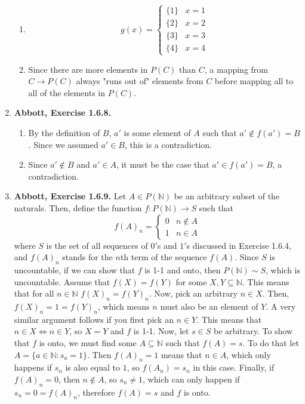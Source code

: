 \documentclass{article}
\newcommand{\N}{\mathbb{N}}
\newcommand{\exc}[2][Abbott]{\item \textbf{#1, Exercise #2.}}
\begin{document}
\begin{enumerate}
\begin{enumerate}
		\item \begin{equation*}
		      g(x) = \begin{cases}
		      \{1\} & x = 1 \\
		      \{2\} & x = 2 \\
		      \{3\} & x = 3 \\ 
		      \{4\} & x = 4
		\end{cases}
		\end{equation*}
							      		      	        
		\item Since there are more elements in $P(C)$ than $C$, a mapping from $C \rightarrow P(C)$ always "runs out of" elements from $C$ before mapping all to all of the elements in $P(C)$.
	\end{enumerate}
				      	          
	\exc{1.6.8}
				      	          
	\begin{enumerate}
		\item By the definition of $B$, $a'$ is some element of $A$ such that $a' \notin f(a') = B$. Since we assumed $a' \in B$, this is a contradiction.
		      		      		      	      	      	      	              
		\item Since $a' \notin B$ and $a' \in A$, it must be the case that $a' \in f(a') = B$, a contradiction.
	\end{enumerate}
				      	          
	\exc{1.6.9}
	Let $A \in P(\N)$ be an arbitrary subset of the naturals. Then, define the function $f : P(\N) \rightarrow S$ such that
	\begin{equation*}
		f(A)_n = \begin{cases}
		0 & n \notin A \\
		1 & n \in A
		\end{cases}
	\end{equation*}
	where $S$ is the set of all sequences of $0'$s and $1'$s discussed in Exercise 1.6.4, and $f(A)_n$ stands for the $n$th term of the sequence $f(A)$. Since $S$ is uncountable, if we can show that $f$ is 1-1 and onto, then $P(\N) \sim S$, which is uncountable. Assume that $f(X) = f(Y)$ for some $X, Y \subseteq \N$. This means that for all $n \in \N$ $f(X)_n = f(Y)_n$. Now, pick an arbitrary $n \in X$. Then, $f(X)_n = 1 = f(Y)_n$, which means $n$ must also be an element of $Y$. A very similar argument follows if you first pick an $n \in Y$. This means that $n \in X \iff n \in Y$, so $X = Y$ and $f$ is 1-1. Now, let $s \in S$ be arbitrary. To show that $f$ is onto, we must find some $A \subseteq \N$ such that $f(A) = s$. To do that let $A = \{a \in \N:s_a = 1\}$. Then $f(A)_n = 1$ means that $n \in A$, which only happens if $s_n$ is also equal to $1$, so $f(A_n) = s_n$ in this case. Finally, if $f(A)_n = 0$, then $n \notin A$, so $s_n \neq 1$, which can only happen if $s_n = 0 = f(A)_n$, therefore $f(A) = s$ and $f$ is onto. 
				      	          

\end{enumerate}
\end{document}
